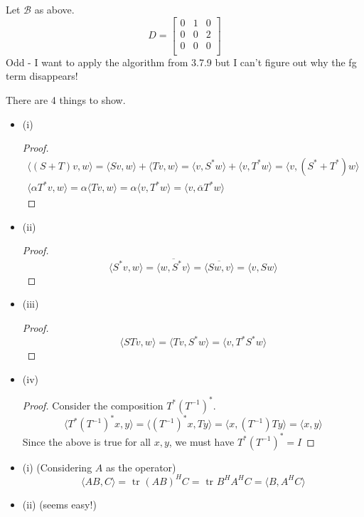 \documentclass[12pt]{article}
\newenvironment{problem}[2][Problem]{\begin{trivlist}
\item[\hskip \labelsep {\bfseries #1}\hskip \labelsep {\bfseries #2.}]}{\end{trivlist}}
\theoremstyle{definition}
\theoremstyle{definition}
\theoremstyle{definition}
\theoremstyle{definition}
\begin{document}
\begin{problem}{3.38} Let $\mathcal{B}$ as above.
$$
D = \begin{bmatrix}
0 & 1 & 0\\
0 & 0 & 2\\
0 & 0 & 0\\
\end{bmatrix}
$$
Odd - I want to apply the algorithm from 3.7.9 but I can't figure out why the fg term disappears!
\end{problem}

\begin{problem}{3.39}
There are 4 things to show.
\begin{itemize}
\item (i)
\begin{proof}
\begin{align*}
\langle (S+T) v, w \rangle = \langle Sv, w \rangle + \langle Tv, w \rangle = \langle v, S^*w \rangle + \langle v, T^*w \rangle = \langle v, (S^* + T^*)w \rangle \\
\langle \alpha T^*v, w \rangle = \alpha \langle Tv, w \rangle= \alpha \langle v, T^*w \rangle = \langle v, \overline{\alpha}T^*w \rangle
\end{align*}
\end{proof}
\item (ii)
\begin{proof}
$$ \langle S^*v, w \rangle = \overline{\langle w, S^*v \rangle} = \overline{\langle Sw, v \rangle} = \langle v, Sw \rangle $$
\end{proof}
\item (iii)
\begin{proof}
$$\langle STv, w \rangle = \langle Tv, S^*w \rangle = \langle v, T^*S^*w \rangle$$
\end{proof}
\item (iv)
\begin{proof}
Consider the composition $T^*(T^{-1})^*$. 
$$
\langle 
T^*(T^{-1})^*x, y \rangle = \langle (T^{-1})^*x, Ty \rangle= \langle x, (T^{-1})Ty \rangle = \langle x, y \rangle
$$
Since the above is true for all $x, y$, we must have $T^*(T^{-1})^* = I $ 
\end{proof}
\end{itemize}
\end{problem}

\begin{problem}{3.40}
\end{problem}
\begin{itemize}
\item (i) (Considering $A$ as the operator)
$$
\langle AB, C \rangle = \text{ tr }(AB)^HC = \text{ tr } B^HA^HC = \langle B, A^HC \rangle
$$
\item (ii) (seems easy!)
\end{itemize}
\end{document}
